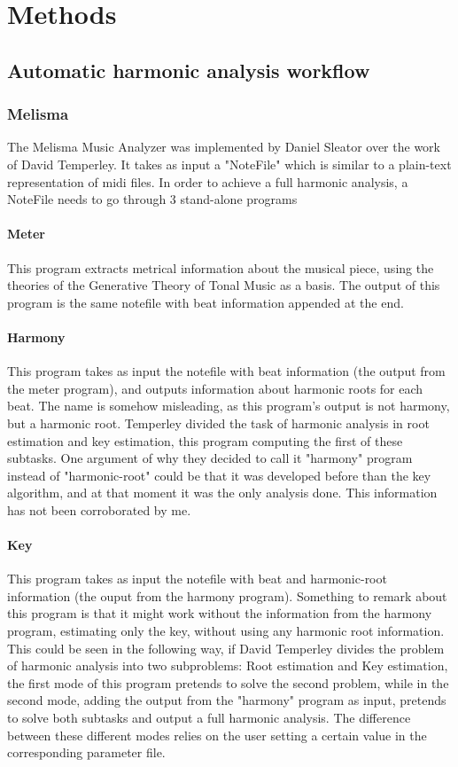 \normallinespacing

\chapter{Methods}

\section{Automatic harmonic analysis workflow}
  \subsection{Melisma}
  The Melisma Music Analyzer was implemented by Daniel Sleator over the work of David Temperley. It takes as input a "NoteFile" which is similar to a plain-text representation of midi files.
  In order to achieve a full harmonic analysis, a NoteFile needs to go through 3 stand-alone programs
  	\subsubsection{Meter}
    This program extracts metrical information about the musical piece, using the theories of the Generative Theory of Tonal Music as a basis.
    The output of this program is the same notefile with beat information appended at the end.
    \subsubsection{Harmony}
    This program takes as input the notefile with beat information (the output from the meter program), and outputs information about harmonic roots for each beat. The name is somehow misleading, as this program's output is not harmony, but a harmonic root. Temperley divided the task of harmonic analysis in root estimation and key estimation, this program computing the first of these subtasks. One argument of why they decided to call it "harmony" program instead of "harmonic-root" could be that it was developed before than the key algorithm, and at that moment it was the only analysis done. This information has not been corroborated by me.
    \subsubsection{Key}
    This program takes as input the notefile with beat and harmonic-root information (the ouput from the harmony program). Something to remark about this program is that it might work without the information from the harmony program, estimating only the key, without using any harmonic root information. This could be seen in the following way, if David Temperley divides the problem of harmonic analysis into two subproblems: Root estimation and Key estimation, the first mode of this program pretends to solve the second problem, while in the second mode, adding the output from the "harmony" program as input, pretends to solve both subtasks and output a full harmonic analysis. The difference between these different modes relies on the user setting a certain value in the corresponding parameter file.
